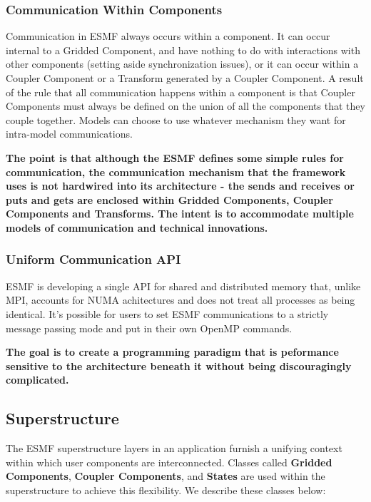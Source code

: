 \subsubsection{Communication Within Components}
Communication in ESMF always occurs within a component.  It
can occur internal to a Gridded Component, and have nothing to do 
with interactions with other components (setting aside 
synchronization issues), or it can occur within a Coupler Component
or a Transform generated by a Coupler Component.  A result of the rule 
that all communication happens within a component is that 
Coupler Components must always be defined on the union of all the
components that they couple together.  Models can choose to 
use whatever mechanism they want for intra-model communications.  

{\bf The point is that although the ESMF defines some simple rules 
for communication, the communication mechanism that the 
framework uses is not hardwired into its architecture -
the sends and receives or puts and gets are enclosed within 
Gridded Components, Coupler Components and Transforms. The intent
is to accommodate 
multiple models of communication and technical innovations.}

\subsubsection{Uniform Communication API}
ESMF is developing a single API for shared and distributed
memory that, unlike MPI, accounts for NUMA achitectures and 
does not treat all processes as being identical.  It's possible for
users to set ESMF communications to a strictly message passing 
mode and put in their own OpenMP commands.

{\bf The goal is to create a programming paradigm 
that is peformance sensitive to the architecture beneath it 
without being discouragingly complicated.}

\subsection{Superstructure}
\label{sec:superstructure}
The ESMF superstructure layers in an application furnish a unifying context 
within which user components are interconnected. Classes 
called {\bf Gridded Components}, 
{\bf Coupler Components}, and {\bf States} are used within the superstructure 
to achieve this flexibility.
We describe these classes below:

